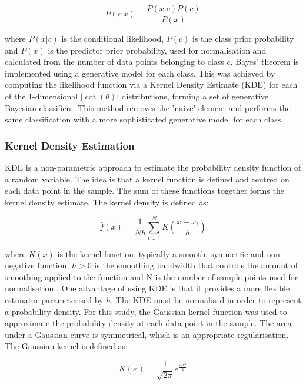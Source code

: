 \begin{equation} \label{naive-bayes}
    P(c|x) = \frac{P(x|c)P(c)}{P(x)}
\end{equation}

where $P(x|c)$ is the conditional likelihood, $P(c)$ is the class prior probability and $P(x)$ is the predictor prior probability, used for normalisation and calculated from the number of data points belonging to class $c$. Bayes' theorem is implemented using a generative model for each class. This was achieved by computing the likelihood function via a Kernel Density Estimate (KDE) for each of the 1-dimensional $|\cot(\theta)|$ distributions, forming a set of generative Bayesian classifiers. This method removes the 'naive' element and performs the same classification with a more sophisticated generative model for each class.

\subsubsection{Kernel Density Estimation}

KDE is a non-parametric approach to estimate the probability density function of a random variable. The idea is that a kernel function is defined and centred on each data point in the sample. The sum of these functions together forms the kernel density estimate. The kernel density is defined as:
    
\begin{equation} \label{eq2}
    \hat{f}(x) = \frac{1}{Nh}  \sum_{i=1}^{N} K \left( \frac{x - x_i}{h} \right)
\end{equation}

where $K(x)$ is the kernel function, typically a smooth, symmetric and non-negative function, $h > 0$ is the smoothing bandwidth that controls the amount of smoothing applied to the function and N is the number of sample points used for normalisation \cite{kde}. One advantage of using KDE is that it provides a more flexible estimator parameterised by $h$. The KDE must be normalised in order to represent a probability density. For this study, the Gaussian kernel function was used to approximate the probability density at each data point in the sample. The area under a Gaussian curve is symmetrical, which is an appropriate regularisation. The Gaussian kernel is defined as:
    
\begin{equation} \label{eq3}
    K(x) = \frac{1}{\sqrt{2\pi}} e^{\frac{-x^2}{2}}
\end{equation}


